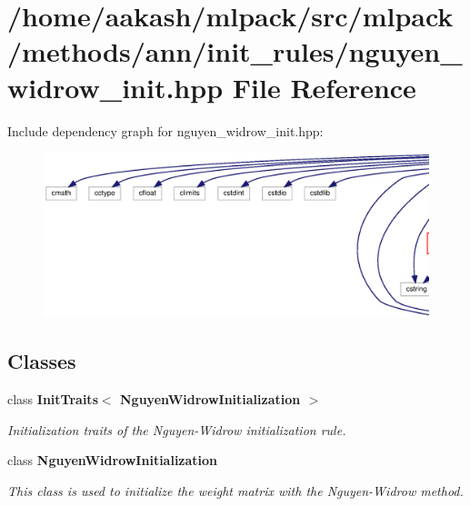 \section{/home/aakash/mlpack/src/mlpack/methods/ann/init\+\_\+rules/nguyen\+\_\+widrow\+\_\+init.hpp File Reference}
\label{nguyen__widrow__init_8hpp}
Include dependency graph for nguyen\+\_\+widrow\+\_\+init.\+hpp\+:
\nopagebreak
\begin{figure}[H]
\begin{center}
\leavevmode
\includegraphics[width=350pt]{nguyen__widrow__init_8hpp__incl}
\end{center}
\end{figure}
\subsection*{Classes}
\begin{DoxyCompactItemize}
\item 
class \textbf{ Init\+Traits$<$ Nguyen\+Widrow\+Initialization $>$}
\begin{DoxyCompactList}\small\item\em Initialization traits of the Nguyen-\/\+Widrow initialization rule. \end{DoxyCompactList}\item 
class \textbf{ Nguyen\+Widrow\+Initialization}
\begin{DoxyCompactList}\small\item\em This class is used to initialize the weight matrix with the Nguyen-\/\+Widrow method. \end{DoxyCompactList}\end{DoxyCompactItemize}
